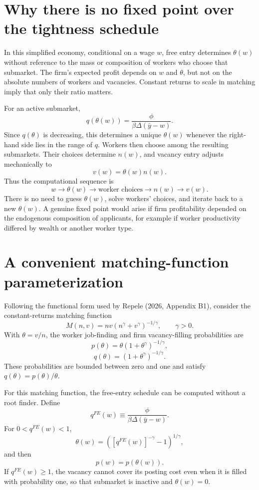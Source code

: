 \documentclass[11pt]{article}
\newcommand{\1}{\mathbf{1}}
\begin{document}
\section{Why there is no fixed point over the tightness schedule}

In this simplified economy, conditional on a wage $w$, free entry determines $\theta(w)$ without reference to the mass or composition of workers who choose that submarket. The firm's expected profit depends on $w$ and $\theta$, but not on the absolute numbers of workers and vacancies. Constant returns to scale in matching imply that only their ratio matters.

For an active submarket,
\[
q(\theta(w))=\frac{\phi}{\beta\Delta(\bar y-w)}.
\tag{1}
\]
Since $q(\theta)$ is decreasing, this determines a unique $\theta(w)$ whenever the right-hand side lies in the range of $q$. Workers then choose among the resulting submarkets. Their choices determine $n(w)$, and vacancy entry adjusts mechanically to
\[
v(w)=\theta(w)n(w).
\]
Thus the computational sequence is
\[
w \longrightarrow \theta(w) \longrightarrow \text{worker choices} \longrightarrow n(w) \longrightarrow v(w).
\]
There is no need to guess $\theta(w)$, solve workers' choices, and iterate back to a new $\theta(w)$. A genuine fixed point would arise if firm profitability depended on the endogenous composition of applicants, for example if worker productivity differed by wealth or another worker type.

\section{A convenient matching-function parameterization}

Following the functional form used by Repele (2026, Appendix B1), consider the constant-returns matching function
\[
M(n,v)=nv\left(n^\gamma+v^\gamma\right)^{-1/\gamma}, \qquad \gamma>0.
\]
With $\theta=v/n$, the worker job-finding and firm vacancy-filling probabilities are
\[
p(\theta)=\theta\left(1+\theta^\gamma\right)^{-1/\gamma},
\]
\[
q(\theta)=\left(1+\theta^\gamma\right)^{-1/\gamma}.
\]
These probabilities are bounded between zero and one and satisfy $q(\theta)=p(\theta)/\theta$.

For this matching function, the free-entry schedule can be computed without a root finder. Define
\[
q^{FE}(w)\equiv \frac{\phi}{\beta\Delta(\bar y-w)}.
\]
For $0<q^{FE}(w)<1$,
\[
\theta(w)=\left(\left[q^{FE}(w)\right]^{-\gamma}-1\right)^{1/\gamma},
\tag{2}
\]
and then
\[
p(w)=p(\theta(w)).
\]
If $q^{FE}(w)\geq 1$, the vacancy cannot cover its posting cost even when it is filled with probability one, so that submarket is inactive and $\theta(w)=0$.
\end{document}
